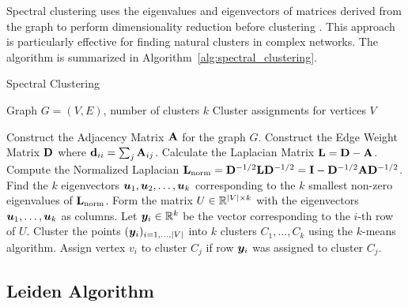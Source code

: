 Spectral clustering uses the eigenvalues and eigenvectors of matrices derived from the graph to perform dimensionality reduction before clustering . This approach is particularly effective for finding natural clusters in complex networks. The algorithm is summarized in Algorithm~\ref{alg:spectral_clustering}.

\begin{algorithm}[H]
\caption{Spectral Clustering}
\label{alg:spectral_clustering}
\begin{algorithmic}[1]
\Require Graph $G = (V, E)$, number of clusters $k$
\Ensure Cluster assignments for vertices $V$

\State Construct the Adjacency Matrix $\mathbf{A}$ for the graph $G$.
\State Construct the Edge Weight Matrix $\mathbf{D}$ where $\mathbf{d}_{ii} = \sum_j \mathbf{A}_{ij}$.
\State Calculate the Laplacian Matrix $\mathbf{L} = \mathbf{D} - \mathbf{A}$.
\State Compute the Normalized Laplacian $\mathbf{L}_{\text{norm}} = \mathbf{D}^{-1/2} \mathbf{L} \mathbf{D}^{-1/2} = \mathbf{I} - \mathbf{D}^{-1/2} \mathbf{A} \mathbf{D}^{-1/2}$.
\State Find the $k$ eigenvectors $\boldsymbol{u}_1, \boldsymbol{u}_2, \dots, \boldsymbol{u}_k$ corresponding to the $k$ smallest non-zero eigenvalues of $\mathbf{L}_{\text{norm}}$.
\State Form the matrix $U \in \mathbb{R}^{|V| \times k}$ with the eigenvectors $\boldsymbol{u}_1, \dots, \boldsymbol{u}_k$ as columns.
\State Let $\boldsymbol{y}_i \in \mathbb{R}^k$ be the vector corresponding to the $i$-th row of $U$.
\State Cluster the points $(\boldsymbol{y}_i)_{i=1, \dots, |V|}$ into $k$ clusters $C_1, \dots, C_k$ using the $k$-means algorithm.
\State Assign vertex $v_i$ to cluster $C_j$ if row $\boldsymbol{y}_i$ was assigned to cluster $C_j$.

\end{algorithmic}
\end{algorithm}


\subsection{Leiden Algorithm}
\label{subsec:LeidenAlgorithm}


